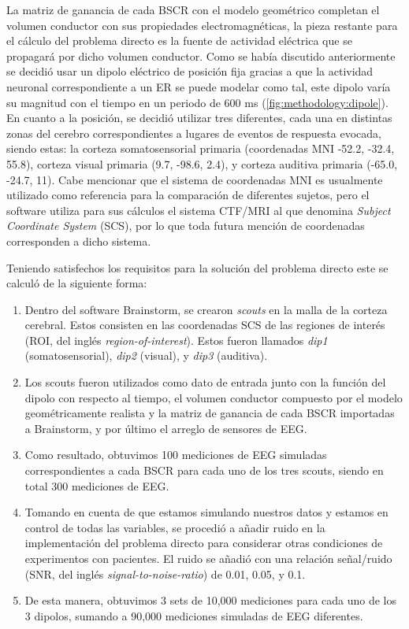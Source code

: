 La matriz de ganancia de cada BSCR con el modelo geométrico completan el volumen conductor con sus propiedades electromagnéticas, la pieza restante para el cálculo del problema directo es la fuente de actividad eléctrica que se propagará por dicho volumen conductor. Como se había discutido anteriormente se decidió usar un dipolo eléctrico de posición fija gracias a que la actividad neuronal correspondiente a un ER se puede modelar como tal, este dipolo varía su magnitud con el tiempo en un periodo de 600 ms (\cref{fig:methodology:dipole}). En cuanto a la posición, se decidió utilizar tres diferentes, cada una en distintas zonas del cerebro correspondientes a lugares de eventos de respuesta evocada, siendo estas: la corteza somatosensorial primaria (coordenadas MNI -52.2, -32.4, 55.8), corteza visual primaria (9.7, -98.6, 2.4), y corteza auditiva primaria (-65.0, -24.7, 11). Cabe mencionar que el sistema de coordenadas MNI  es usualmente utilizado como referencia para la comparación de diferentes sujetos, pero el software utiliza para sus cálculos el sistema CTF/MRI al que denomina \emph{Subject Coordinate System} (SCS), por lo que toda futura mención de coordenadas corresponden a dicho sistema.

Teniendo satisfechos los requisitos para la solución del problema directo este se calculó de la siguiente forma:

\begin{enumerate}
	\item Dentro del software Brainstorm, se crearon \emph{scouts} en la malla de la corteza cerebral. Estos consisten en las coordenadas SCS de las regiones de interés (ROI, del inglés \emph{region-of-interest}). Estos fueron llamados \emph{dip1} (somatosensorial), \emph{dip2} (visual), y \emph{dip3} (auditiva).
	\item Los scouts fueron utilizados como dato de entrada junto con la función del dipolo con respecto al tiempo, el volumen conductor compuesto por el modelo geométricamente realista y la matriz de ganancia de cada BSCR importadas a Brainstorm, y por último el arreglo de sensores de EEG.
	\item Como resultado, obtuvimos 100 mediciones de EEG simuladas correspondientes a cada BSCR para cada uno de los tres scouts, siendo en total 300 mediciones de EEG.
	\item Tomando en cuenta de que estamos simulando nuestros datos y estamos en control de todas las variables, se procedió a añadir ruido en la implementación del problema directo para considerar otras condiciones de experimentos con pacientes. El ruido se añadió con una relación señal/ruido (SNR, del inglés \emph{signal-to-noise-ratio}) de 0.01, 0.05, y 0.1.
	\item De esta manera, obtuvimos 3 sets de 10,000 mediciones para cada uno de los 3 dipolos, sumando a 90,000 mediciones simuladas de EEG diferentes.
\end{enumerate}


